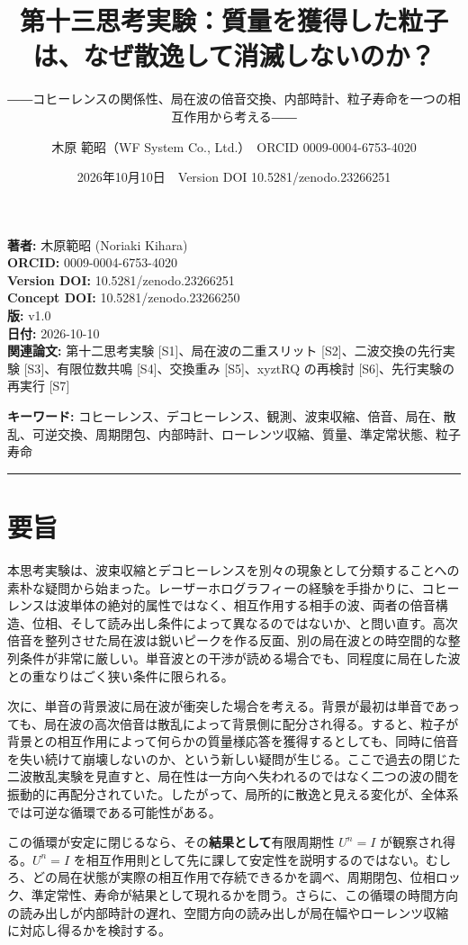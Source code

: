 \documentclass[
  a4paper,
]{ltjsarticle}
\title{第十三思考実験：質量を獲得した粒子は、なぜ散逸して消滅しないのか？}
\subtitle{――コヒーレンスの関係性、局在波の倍音交換、内部時計、粒子寿命を一つの相互作用から考える――}
\author{木原 範昭（WF System Co., Ltd.）　ORCID 0009-0004-6753-4020}
\date{2026年10月10日　Version DOI 10.5281/zenodo.23266251}
\begin{document}
\maketitle

\textbf{著者:} 木原範昭 (Noriaki Kihara)\\
\textbf{ORCID:} 0009-0004-6753-4020\\
\textbf{Version DOI:} 10.5281/zenodo.23266251\\
\textbf{Concept DOI:} 10.5281/zenodo.23266250\\
\textbf{版:} v1.0\\
\textbf{日付:} 2026-10-10\\
\textbf{関連論文:} 第十二思考実験 {[}S1{]}、局在波の二重スリット
{[}S2{]}、二波交換の先行実験 {[}S3{]}、有限位数共鳴 {[}S4{]}、交換重み
{[}S5{]}、xyztRQ の再検討 {[}S6{]}、先行実験の再実行 {[}S7{]}

\textbf{キーワード:}
コヒーレンス、デコヒーレンス、観測、波束収縮、倍音、局在、散乱、可逆交換、周期閉包、内部時計、ローレンツ収縮、質量、準定常状態、粒子寿命

\begin{center}\rule{0.5\linewidth}{0.5pt}\end{center}

\section{要旨}\label{ux8981ux65e8}

本思考実験は、波束収縮とデコヒーレンスを別々の現象として分類することへの素朴な疑問から始まった。レーザーホログラフィーの経験を手掛かりに、コヒーレンスは波単体の絶対的属性ではなく、相互作用する相手の波、両者の倍音構造、位相、そして読み出し条件によって異なるのではないか、と問い直す。高次倍音を整列させた局在波は鋭いピークを作る反面、別の局在波との時空間的な整列条件が非常に厳しい。単音波との干渉が読める場合でも、同程度に局在した波との重なりはごく狭い条件に限られる。

次に、単音の背景波に局在波が衝突した場合を考える。背景が最初は単音であっても、局在波の高次倍音は散乱によって背景側に配分され得る。すると、粒子が背景との相互作用によって何らかの質量様応答を獲得するとしても、同時に倍音を失い続けて崩壊しないのか、という新しい疑問が生じる。ここで過去の閉じた二波散乱実験を見直すと、局在性は一方向へ失われるのではなく二つの波の間を振動的に再配分されていた。したがって、局所的に散逸と見える変化が、全体系では可逆な循環である可能性がある。

この循環が安定に閉じるなら、その\textbf{結果として}有限周期性 \(U^n=I\)
が観察され得る。\(U^n=I\)
を相互作用則として先に課して安定性を説明するのではない。むしろ、どの局在状態が実際の相互作用で存続できるかを調べ、周期閉包、位相ロック、準定常性、寿命が結果として現れるかを問う。さらに、この循環の時間方向の読み出しが内部時計の遅れ、空間方向の読み出しが局在幅やローレンツ収縮に対応し得るかを検討する。
\end{document}
